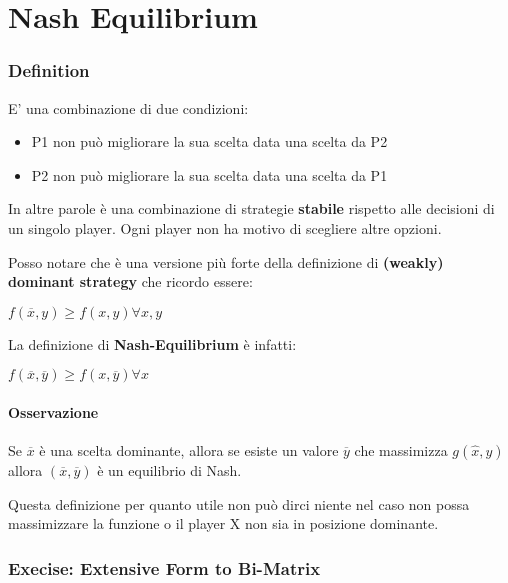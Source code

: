 \documentclass[10pt,a4paper]{report}
\begin{document}
        \chapter{Nash Equilibrium}

        \subsection{Definition}
        E' una combinazione di due condizioni:
        \begin{itemize}
            \item P1 non può migliorare la sua scelta data una scelta da P2
            \item P2 non può migliorare la sua scelta data una scelta da P1
        \end{itemize}

        In altre parole è una combinazione di strategie \textbf{stabile} rispetto alle decisioni di un singolo player.
        Ogni player non ha motivo di scegliere altre opzioni.

        Posso notare che è una versione più forte della definizione di \textbf{(weakly) dominant strategy} che ricordo essere:
        \begin{center}
            $f(\overline{x}, y) \ge f(x,y) \forall x,y$
        \end{center}

        La definizione di \textbf{Nash-Equilibrium} è infatti:
        \begin{center}
            $f(\overline{x}, \overline{y}) \ge f(x,\overline{y}) \forall x$
        \end{center} 

        \subsubsection{Osservazione}

        Se $\overline{x}$ è una scelta dominante, allora se esiste un valore $\overline{y}$ che massimizza $g(\hat{x}, y)$ allora $(\overline{x}, \overline{y})$ è un equilibrio di Nash.

        Questa definizione per quanto utile non può dirci niente nel caso non possa massimizzare la funzione o il player X non sia in posizione dominante.

        \subsection{Execise: Extensive Form to Bi-Matrix}
\end{document}
